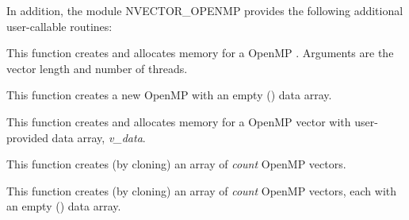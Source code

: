 \documentclass[letterpaper,10pt,english]{sphinxmanual}
\begin{document}
In addition, the module NVECTOR\_OPENMP provides the following
additional user-callable routines:

\begin{fulllineitems}
\label{nvectors/NVector_OpenMP:N_VNew_OpenMP}
This function creates and allocates memory for a OpenMP
. Arguments are the vector length and number of threads.

\end{fulllineitems}


\begin{fulllineitems}
\label{nvectors/NVector_OpenMP:N_VNewEmpty_OpenMP}
This function creates a new OpenMP  with an empty
() data array.

\end{fulllineitems}


\begin{fulllineitems}
\label{nvectors/NVector_OpenMP:N_VMake_OpenMP}
This function creates and allocates memory for a OpenMP vector with
user-provided data array, \emph{v\_data}.

\end{fulllineitems}


\begin{fulllineitems}
\label{nvectors/NVector_OpenMP:N_VCloneVectorArray_OpenMP}
This function creates (by cloning) an array of \emph{count} OpenMP
vectors.

\end{fulllineitems}


\begin{fulllineitems}
\label{nvectors/NVector_OpenMP:N_VCloneEmptyVectorArray_OpenMP}
This function creates (by cloning) an array of \emph{count} OpenMP
vectors, each with an empty () data array.

\end{fulllineitems}
\end{document}
